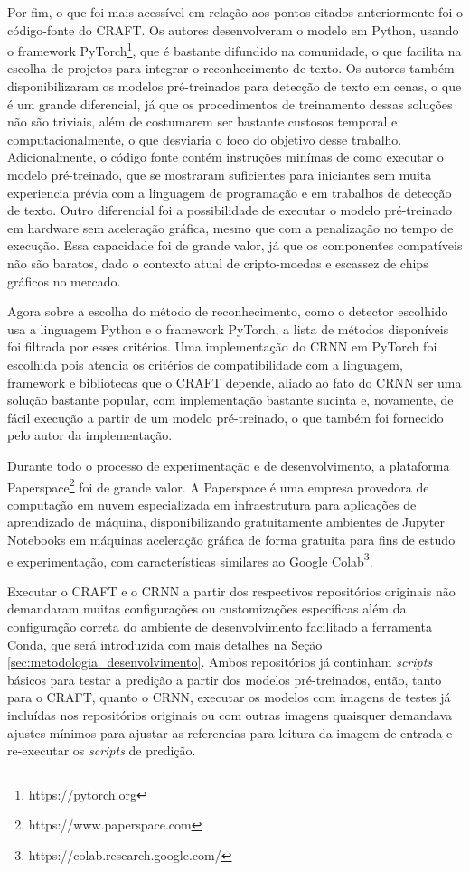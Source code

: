 Por fim, o que foi mais acessível em relação aos pontos citados anteriormente foi o código-fonte do CRAFT. Os autores desenvolveram o modelo em Python, usando o framework PyTorch\footnote{https://pytorch.org}, que é bastante difundido na comunidade, o que facilita na escolha de projetos para integrar o reconhecimento de texto. Os autores também disponibilizaram os modelos pré-treinados para detecção de texto em cenas, o que é um grande diferencial, já que os procedimentos de treinamento dessas soluções não são triviais, além de costumarem ser bastante custosos temporal e computacionalmente, o que desviaria o foco do objetivo desse trabalho. Adicionalmente, o código fonte contém instruções minímas de como executar o modelo pré-treinado, que se mostraram suficientes para iniciantes sem muita experiencia prévia com a linguagem de programação e em trabalhos de detecção de texto. Outro diferencial foi a possibilidade de executar o modelo pré-treinado em hardware sem aceleração gráfica, mesmo que com a penalização no tempo de execução. Essa capacidade foi de grande valor, já que os componentes compatíveis não são baratos, dado o contexto atual de cripto-moedas e escassez de chips gráficos no mercado.

Agora sobre a escolha do método de reconhecimento, como o detector escolhido usa a linguagem Python e o framework PyTorch, a lista de métodos disponíveis foi filtrada por esses critérios. Uma implementação do CRNN em PyTorch foi escolhida pois atendia os critérios de compatibilidade com a linguagem, framework e bibliotecas que o CRAFT depende, aliado ao fato do CRNN ser uma solução bastante popular, com implementação bastante sucinta e, novamente, de fácil execução a partir de um modelo pré-treinado, o que também foi fornecido pelo autor da implementação.

Durante todo o processo de experimentação e de desenvolvimento, a plataforma Paperspace\footnote{https://www.paperspace.com} foi de grande valor. A Paperspace é uma empresa provedora de computação em nuvem especializada em infraestrutura para aplicações de aprendizado de máquina, disponibilizando gratuitamente ambientes de Jupyter Notebooks em máquinas aceleração gráfica de forma gratuita para fins de estudo e experimentação, com características similares ao Google Colab\footnote{https://colab.research.google.com/}.

Executar o CRAFT e o CRNN a partir dos respectivos repositórios originais não demandaram muitas configurações ou customizações específicas além da configuração correta do ambiente de desenvolvimento facilitado a ferramenta Conda, que será introduzida com mais detalhes na Seção \ref{sec:metodologia_desenvolvimento}. Ambos repositórios já continham \textit{scripts} básicos para testar a predição a partir dos modelos pré-treinados, então, tanto para o CRAFT, quanto o CRNN, executar os modelos com imagens de testes já incluídas nos repositórios originais ou com outras imagens quaisquer demandava ajustes mínimos para ajustar as referencias para leitura da imagem de entrada e re-executar os \textit{scripts} de predição.

